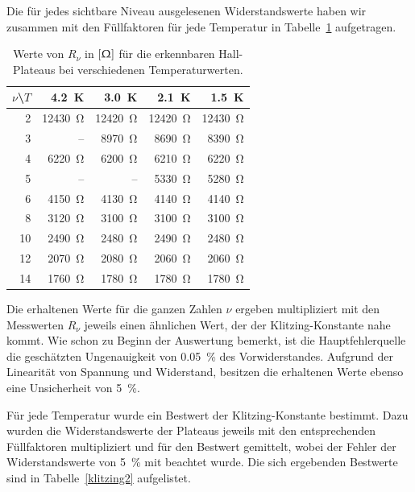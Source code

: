 \documentclass[paper=a4,fontsize=10pt,DIV=18,twocolumn,parskip=half]{scrartcl}
\numberwithin{equation}{section}    %
\begin{document}
Die für jedes sichtbare Niveau ausgelesenen Widerstandswerte haben wir zusammen mit den Füllfaktoren für jede Temperatur in Tabelle~\ref{klitzing} aufgetragen.

\begin{table}[htp]
	\begin{center}
	\begin{tabular}{r|rrrr}
		$\nu$\textbackslash$T$ & \SI{4.2}{\kelvin} & \SI{3.0}{\kelvin} & \SI{2.1}{\kelvin} & \SI{1.5}{\kelvin} \\
		\hline
		2  & \SI{12430}{\ohm} & \SI{12420}{\ohm} & \SI{12420}{\ohm} & \SI{12430}{\ohm}\\
		3  &      \--- &  \SI{8970}{\ohm} &  \SI{8690}{\ohm} &  \SI{8390}{\ohm}\\
		4  &  \SI{6220}{\ohm} &  \SI{6200}{\ohm} &  \SI{6210}{\ohm} &  \SI{6220}{\ohm}\\
		5  &      \--- &      \--- &  \SI{5330}{\ohm} &  \SI{5280}{\ohm}\\
		6  &  \SI{4150}{\ohm} &  \SI{4130}{\ohm} &  \SI{4140}{\ohm} &  \SI{4140}{\ohm}\\
		8  &  \SI{3120}{\ohm} &  \SI{3100}{\ohm} &  \SI{3100}{\ohm} &  \SI{3100}{\ohm}\\
		10 &  \SI{2490}{\ohm} &  \SI{2480}{\ohm} &  \SI{2490}{\ohm} &  \SI{2480}{\ohm}\\
		12 &  \SI{2070}{\ohm} &  \SI{2080}{\ohm} &  \SI{2060}{\ohm} &  \SI{2060}{\ohm}\\
		14 &  \SI{1760}{\ohm} &  \SI{1780}{\ohm} &  \SI{1780}{\ohm} &  \SI{1780}{\ohm}\\
		\hline
	\end{tabular}
	\caption{Werte von $R_\nu$ in $\left[\Upomega\right]$ für die erkennbaren Hall-Plateaus bei verschiedenen Temperaturwerten.}
	\label{klitzing}	
	\end{center}
\end{table}

Die erhaltenen Werte für die ganzen Zahlen $\nu$ ergeben multipliziert mit den Messwerten $R_{\nu}$ jeweils einen ähnlichen Wert,
der der Klitzing-Konstante nahe kommt. 
Wie schon zu Beginn der Auswertung bemerkt, ist die Hauptfehlerquelle die geschätzten Ungenauigkeit von \SI{0.05}{\percent} des Vorwiderstandes. Aufgrund der Linearität von Spannung und Widerstand, besitzen die erhaltenen Werte ebenso eine Unsicherheit von \SI{5}{\percent}. 

Für jede Temperatur wurde ein Bestwert der Klitzing-Konstante bestimmt. Dazu wurden die Widerstandswerte der Plateaus jeweils mit den entsprechenden Füllfaktoren multipliziert und für den Bestwert gemittelt, wobei der Fehler der Widerstandswerte von \SI{5}{\percent} mit beachtet wurde.
Die sich ergebenden Bestwerte sind in Tabelle~\ref{klitzing2} aufgelistet. 
\end{document}
